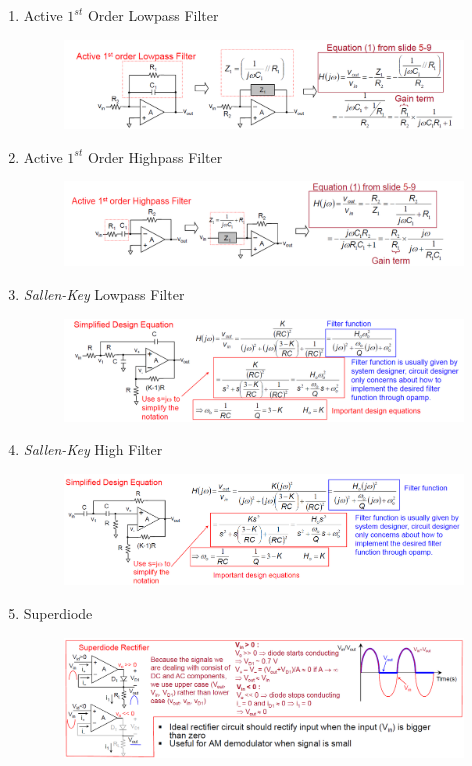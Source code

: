 \documentclass{article}
\begin{document}
\begin{enumerate}
\begin{minipage}{0.5\textwidth}
    \end{minipage}
    \item Active $1^{st}$ Order Lowpass Filter
    \begin{figure}[h]
        \centering
        \includegraphics[width=0.75\linewidth]{image/1sactivelowe.png}
    \end{figure}
    \item Active $1^{st}$ Order Highpass Filter
    \begin{figure}[h]
        \centering
        \includegraphics[width=0.78\linewidth]{image/1stactivehigh.png}
    \end{figure}
    \item \textit{Sallen-Key} Lowpass Filter 
    \begin{figure}[h]
        \centering
        \includegraphics[width=0.75\linewidth]{image/ssklowpass.png}
    \end{figure}
    \newpage
    \item \textit{Sallen-Key} High Filter
    \begin{figure}[!h]
        \centering
        \includegraphics[width=0.75\linewidth]{image/skhighpass.png}
    \end{figure}
    \item Superdiode
    \begin{figure}[!h]
        \centering
        \includegraphics[width=0.75\linewidth]{image/superdiode.png}

\end{figure}
\end{enumerate}
\end{document}
